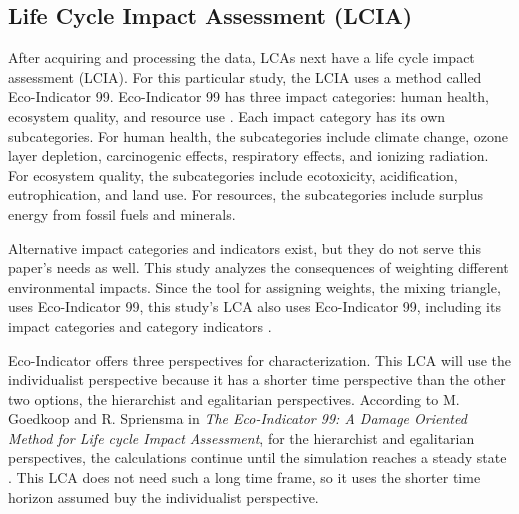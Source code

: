 \documentclass[final,journal,10pt,letterpaper,oneside,twocolumn,compsoc]%
{IEEEtran}
\begin{document}
\subsection{Life Cycle Impact Assessment (LCIA)}
After acquiring and processing the data, LCAs next have a life cycle impact
assessment (LCIA). For this particular study, the LCIA uses a method called
Eco-Indicator 99. Eco-Indicator 99 has three impact categories: human health,
ecosystem quality, and resource use \cite{pre}. Each impact category has its own
subcategories. For human health, the subcategories include climate
change, ozone layer depletion, carcinogenic effects, respiratory effects, and
ionizing radiation. For ecosystem quality, the subcategories include
ecotoxicity,
acidification, eutrophication, and land use. For resources, the subcategories
include surplus energy from fossil fuels and minerals. 

Alternative impact categories and indicators exist, but they do not serve this
paper's needs as well. This study analyzes the consequences of weighting
different environmental
impacts. Since the tool for assigning weights, the mixing triangle, uses
Eco-Indicator 99, this study's LCA also uses Eco-Indicator 99, including its
impact categories and category indicators \cite{triangle} \cite{pre}.

Eco-Indicator offers three perspectives for characterization. This LCA will use
the individualist perspective because it has a shorter time
perspective than the other two options, the hierarchist and egalitarian
perspectives. According to M. Goedkoop and R. Spriensma in
\textit{The Eco-Indicator 99: A Damage Oriented Method for Life cycle Impact
Assessment}, for the hierarchist and egalitarian
perspectives, the calculations continue until the simulation reaches a steady
state \cite{pre-annex}. This LCA does not need such a long time frame, so it
uses the shorter time horizon assumed buy the individualist perspective.
\end{document}
